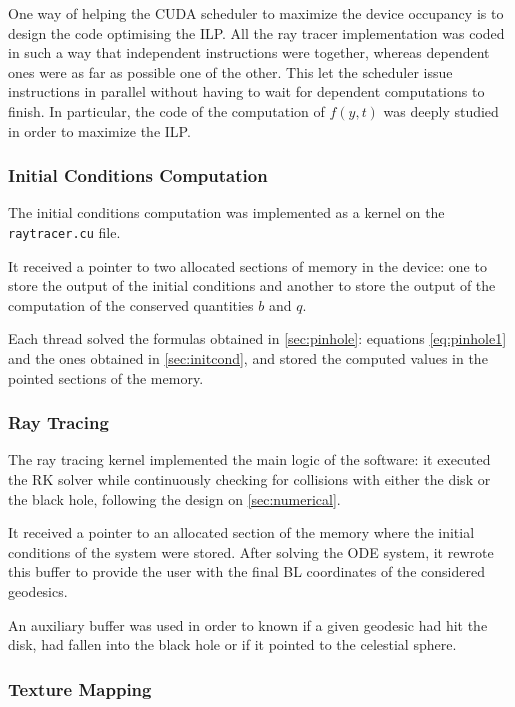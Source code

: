 One way of helping the \ac{CUDA} scheduler to maximize the device occupancy is to design the code optimising the \ac{ILP}. All the ray tracer implementation was coded in such a way that independent instructions were together, whereas dependent ones were as far as possible one of the other. This let the scheduler issue instructions in parallel without having to wait for dependent computations to finish. In particular, the code of the computation of $f(y,t)$ was deeply studied in order to maximize the \ac{ILP}.

\subsubsection*{Initial Conditions Computation}

The initial conditions computation was implemented as a kernel on the \lstinline{raytracer.cu} file.

It received a pointer to two allocated sections of memory in the device: one to store the output of the initial conditions and another to store the output of the computation of the conserved quantities $b$ and $q$.

Each thread solved the formulas obtained in \autoref{sec:pinhole}: equations \ref{eq:pinhole1} and the ones obtained in \autoref{sec:initcond}, and stored the computed values in the pointed sections of the memory.

\subsubsection*{Ray Tracing}

The ray tracing kernel implemented the main logic of the software: it executed the \ac{RK} solver while continuously checking for collisions with either the disk or the black hole, following the design on \autoref{sec:numerical}.

It received a pointer to an allocated section of the memory where the initial conditions of the system were stored. After solving the \ac{ODE} system, it rewrote this buffer to provide the user with the final \ac{BL} coordinates of the considered geodesics.

An auxiliary buffer was used in order to known if a given geodesic had hit the disk, had fallen into the black hole or if it pointed to the celestial sphere.

\subsubsection*{Texture Mapping}


